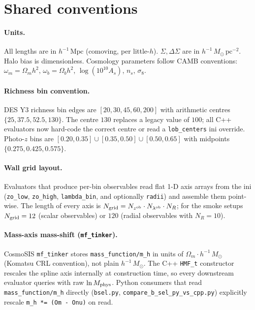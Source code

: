 \documentclass[a4paper, 11pt]{article}
\newcommand{\lob}{\lambda^{\rm ob}}
\newcommand{\zob}{z^{\rm ob}}
\newcommand{\hMpc}{h^{-1}\,\mathrm{Mpc}}
\newcommand{\hMsun}{h^{-1}\,M_{\odot}}
\newcommand{\modname}[1]{\textcolor{kwcol}{\texttt{#1}}}
\newcommand{\blk}[1]{\textcolor{datablockcol}{\texttt{#1}}}
\begin{document}
\section{Shared conventions}
\label{sec:conventions}

\paragraph{Units.}  All lengths are in $\hMpc$ (comoving, per
little-$h$).  $\Sigma, \Delta\Sigma$ are in $\hMsun\,\mathrm{pc}^{-2}$.
Halo bias is dimensionless.  Cosmology parameters follow CAMB
conventions: $\omega_m = \Omega_m h^2$, $\omega_b = \Omega_b h^2$,
$\log(10^{10} A_s)$, $n_s$, $\sigma_8$.

\paragraph{Richness bin convention.}  DES Y3 richness bin edges are
$[20, 30, 45, 60, 200]$ with arithmetic centres $\{25, 37.5, 52.5,
130\}$.  The centre $130$ replaces a legacy value of $100$; all C++
evaluators now hard-code the correct centre or read a
\modname{lob\_centers} ini override.  Photo-$z$ bins are $[0.20, 0.35]
\cup [0.35, 0.50] \cup [0.50, 0.65]$ with midpoints
$\{0.275, 0.425, 0.575\}$.

\paragraph{Wall grid layout.}  Evaluators that produce per-bin
observables read flat 1-D axis arrays from the ini
(\texttt{zo\_low}, \texttt{zo\_high}, \texttt{lambda\_bin}, and
optionally \texttt{radii}) and assemble them point-wise.  The length
of every axis is $N_{\rm grid} = N_{\zob} \cdot N_{\lob} \cdot N_R$;
for the smoke setups $N_{\rm grid} = 12$ (scalar observables) or
$120$ (radial observables with $N_R = 10$).

\paragraph{Mass-axis mass-shift (\texttt{mf\_tinker}).}  CosmoSIS
\modname{mf\_tinker} stores \blk{mass\_function/m\_h} in units of
$\Omega_m \cdot \hMsun$ (Komatsu CRL convention), not plain $\hMsun$.
The C++ \texttt{HMF\_t} constructor rescales the spline axis internally
at construction time, so every downstream evaluator queries with
raw $\ln M_{\rm phys}$.  Python consumers that read
\blk{mass\_function/m\_h} directly (\modname{bsel.py},
\modname{compare\_b\_sel\_py\_vs\_cpp.py}) explicitly rescale
\texttt{m\_h *= (Om - Onu)} on read.
\end{document}
